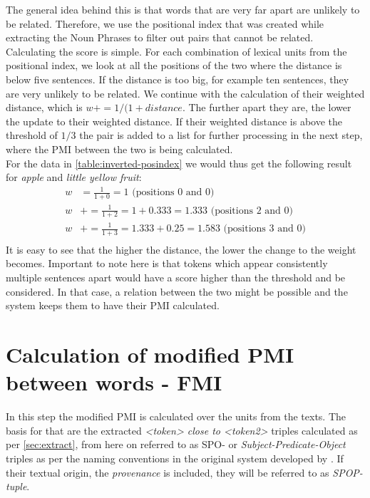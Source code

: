 The general idea behind this is that words that are very far apart are unlikely to be related. Therefore, we use the positional index that was created while extracting the Noun Phrases to filter out pairs that cannot be related.\\
Calculating the score is simple. For each combination of lexical units from the positional index, we look at all the positions of the two where the distance is below five sentences. If the distance is too big, for example ten sentences, they are very unlikely to be related. We continue with the calculation of their weighted distance, which is \(w += 1/(1 + distance\). The further apart they are, the lower the update to their weighted distance. If their weighted distance is above the threshold of \(1/3\) the pair is added to a list for further processing in the next step, where the PMI between the two is being calculated.\\
For the data in \ref{table:inverted-posindex} we would thus get the following result for \textit{apple} and \textit{little yellow fruit}:
\begin{equation}\label{gather:weighteddistance}
\begin{aligned}
w &= \frac{1}{1+0} = 1 \text{ (positions 0 and 0)} \\ 
w &+= \frac{1}{1+2} = 1 + 0.333 = 1.333 \text{ (positions 2 and 0)}\\
w &+= \frac{1}{1+3} = 1.333 + 0.25 = 1.583 \text{ (positions 3 and 0)}\\
\end{aligned}
\end{equation}
It is easy to see that the higher the distance, the lower the change to the weight becomes. Important to note here is that tokens which appear consistently multiple sentences apart would have a score higher than the threshold and be considered. In that case, a relation between the two might be possible and the system keeps them to have their PMI calculated.

\section{Calculation of modified PMI between words - FMI}\label{sec:kbcreate}
In this step the modified PMI is calculated over the units from the texts. The basis for that are the extracted \textit{<token> close to <token2>} triples calculated as per \ref{sec:extract}, from here on referred to as SPO- or \textit{Subject-Predicate-Object} triples as per the naming conventions in the original system developed by \cite{novavcek2014skimmr}. If their textual origin, the \textit{provenance} is included, they will be referred to as \textit{SPOP-tuple}.\\


